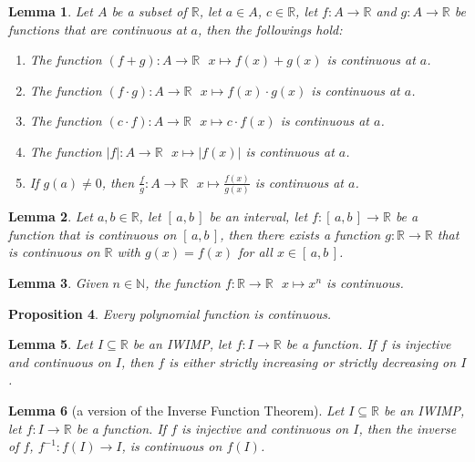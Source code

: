 \documentclass[11pt]{article}
\theoremstyle{break}
\theoremstyle{break}
\newtheorem{lem}{Lemma}[thm]
\newtheorem{prop}[lem]{Proposition}
\newcommand{\R}{\mathbb{R}}
\newcommand{\N}{\mathbb{N}}
\newcommand{\Intab}{[\,a,b\,]}
\begin{document}
	\begin{lem}
		Let $A$ be a subset of $\R$, let $a \in A$, $c \in \R$, let $f:A \to \R$ and $g:A \to \R$ be functions that are continuous at $a$, then the followings hold:
		\begin{enumerate}[topsep=3pt,itemsep=-1ex,partopsep=1ex,parsep=1ex]
			\item The function $(f+g):A \to \R \ \ \ x \mapsto f(x)+g(x)$ is continuous at $a$.
			\item The function $(f \cdot g):A \to \R \ \ \ x \mapsto f(x) \cdot g(x)$ is continuous at $a$.
			\item The function $(c \cdot f):A \to \R \ \ \ x \mapsto c \cdot f(x)$ is continuous at $a$.
			\item The function $|f|:A \to \R \ \ \ x \mapsto |f(x)|$ is continuous at $a$.
			\item If $g(a) \neq 0$, then $\frac{f}{g}:A \to \R \ \ \ x \mapsto \frac{f(x)}{g(x)}$ is continuous at $a$.
		\end{enumerate}
	\end{lem}
	
	\begin{lem}
		Let $a,b \in \R$, let $\Intab$ be an interval, let $f:\Intab \to \R$ be a function that is continuous on $\Intab$, then there exists a function $g:\R \to \R$ that is continuous on $\R$ with $g(x)=f(x)$ for all $x \in \Intab$.
	\end{lem}
	
	\begin{lem}
		Given $n \in \N$, the function $f:\R \to \R \ \ \ x \mapsto x^n$ is continuous.
	\end{lem}

	\begin{prop}
		Every polynomial function is continuous.
	\end{prop}
	
	\begin{lem}
		Let $I \subseteq \R$ be an IWIMP, let $f:I \to \R$ be a function. If $f$ is injective and continuous on $I$, then $f$ is either strictly increasing or strictly decreasing on $I$.
	\end{lem}
	
	\begin{lem}[a version of the Inverse Function Theorem]
		Let $I \subseteq \R$ be an IWIMP, let $f:I \to \R$ be a function. If $f$ is injective and continuous on $I$, then the inverse of $f$, $f^{-1}:f(I) \to I$, is continuous on $f(I)$.
	\end{lem}
	
\end{document}
